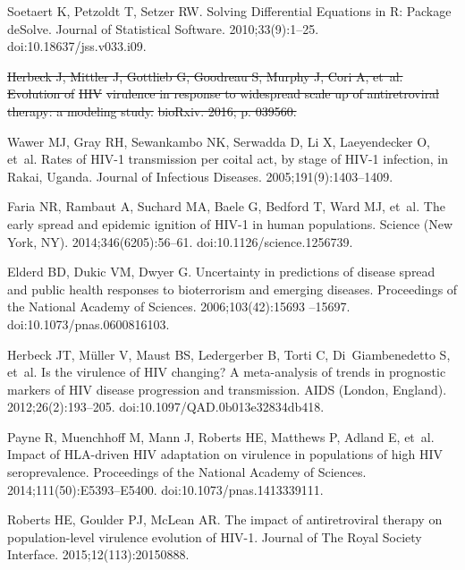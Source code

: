 \documentclass[10pt,letterpaper]{article}
\providecommand{\DIFdeltex}[1]{{\protect\color{red}\sout{#1}}}                      %
\providecommand{\DIFdelbegin}{} %
\providecommand{\DIFdelend}{} %
\providecommand{\DIFdel}[1]{\texorpdfstring{\DIFdeltex{#1}}{}} %
\newcommand{\DIFscaledelfig}{0.5}
\newlength{\DIFdelgraphicswidth} %
\newlength{\DIFdelgraphicsheight} %
\newcommand{\DIFdelincludegraphics}[2][]{%
\sbox{\DIFdelgraphicsbox}{\DIFOincludegraphics[#1]{#2}}%
\settoboxwidth{\DIFdelgraphicswidth}{\DIFdelgraphicsbox} %
\settoboxtotalheight{\DIFdelgraphicsheight}{\DIFdelgraphicsbox} %
\scalebox{\DIFscaledelfig}{%
\parbox[b]{\DIFdelgraphicswidth}{\usebox{\DIFdelgraphicsbox}\\[-\baselineskip] \rule{\DIFdelgraphicswidth}{0em}}\llap{\resizebox{\DIFdelgraphicswidth}{\DIFdelgraphicsheight}{%
\setlength{\unitlength}{\DIFdelgraphicswidth}%
\begin{picture}(1,1)%
\thicklines\linethickness{2pt} %
{\color[rgb]{1,0,0}\put(0,0){\framebox(1,1){}}}%
{\color[rgb]{1,0,0}\put(0,0){\line( 1,1){1}}}%
{\color[rgb]{1,0,0}\put(0,1){\line(1,-1){1}}}%
\end{picture}%
}\hspace*{3pt}}} %
} %
\DeclareRobustCommand{\DIFdelbegin}{\DIFOdelbegin \let\includegraphics\DIFdelincludegraphics} %
\DeclareRobustCommand{\DIFdelend}{\DIFOaddend \let\includegraphics\DIFOincludegraphics} %
\begin{document}
\begin{thebibliography}{10}
Soetaert K, Petzoldt T, Setzer RW.
\newblock Solving Differential Equations in {R}: Package {deSolve}.
\newblock Journal of Statistical Software. 2010;33(9):1--25.
\newblock doi:{10.18637/jss.v033.i09}.

\DIFdelbegin %
\DIFdel{Herbeck J, Mittler J, Gottlieb G, Goodreau S, Murphy J, Cori A, et~al.
}%
\DIFdel{Evolution of }%
\DIFdel{HIV}%
\DIFdel{virulence in response to widespread scale up of
  antiretroviral therapy: a modeling study.
}%
\DIFdel{bioRxiv. 2016; p. 039560.
}%

\DIFdelend {}
Wawer MJ, Gray RH, Sewankambo NK, Serwadda D, Li X, Laeyendecker O, et~al.
\newblock Rates of {HIV}-1 transmission per coital act, by stage of {HIV}-1
  infection, in {Rakai}, {Uganda}.
\newblock Journal of Infectious Diseases. 2005;191(9):1403--1409.

Faria NR, Rambaut A, Suchard MA, Baele G, Bedford T, Ward MJ, et~al.
\newblock The early spread and epidemic ignition of {HIV}-1 in human
  populations.
\newblock Science (New York, NY). 2014;346(6205):56--61.
\newblock doi:{10.1126/science.1256739}.

Elderd BD, Dukic VM, Dwyer G.
\newblock Uncertainty in predictions of disease spread and public health
  responses to bioterrorism and emerging diseases.
\newblock Proceedings of the National Academy of Sciences. 2006;103(42):15693
  --15697.
\newblock doi:{10.1073/pnas.0600816103}.

Herbeck JT, Müller V, Maust BS, Ledergerber B, Torti C, Di~Giambenedetto S,
  et~al.
\newblock Is the virulence of {HIV} changing? {A} meta-analysis of trends in
  prognostic markers of {HIV} disease progression and transmission.
\newblock AIDS (London, England). 2012;26(2):193--205.
\newblock doi:{10.1097/QAD.0b013e32834db418}.

Payne R, Muenchhoff M, Mann J, Roberts HE, Matthews P, Adland E, et~al.
\newblock Impact of {HLA}-driven {HIV} adaptation on virulence in populations
  of high {HIV} seroprevalence.
\newblock Proceedings of the National Academy of Sciences.
  2014;111(50):E5393--E5400.
\newblock doi:{10.1073/pnas.1413339111}.

Roberts HE, Goulder PJ, McLean AR.
\newblock The impact of antiretroviral therapy on population-level virulence
  evolution of {HIV}-1.
\newblock Journal of The Royal Society Interface. 2015;12(113):20150888.

\end{thebibliography}
 \DIFdelbegin %

\DIFdelend
\end{document}
